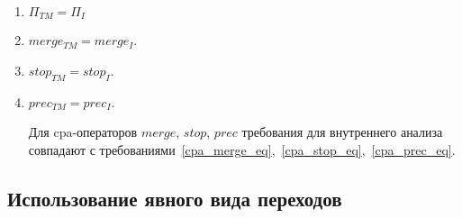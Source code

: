 \begin{enumerate}
\begin{proof}
Действительно, рассмотрим случайный переход $\tau \tcarrow \tau'$, $\tau \in \conc{R}$.
Нужно показать, что $\exists k: \tau' \in Reach^k(R)$.
Так как $\tau \in \conc{R}$ по определению $\conc{R}$~\ref{cpa_conc_tm_def} это означает, что $\exists t, t_1, \dots, t_n \in T, t_i \neq t_j, e_0, e_1, \dots, e_n \in R:$\\
$\tau \in \epp_I
\left(
\begin{pmatrix}
e_0 \\
t_0 
\end{pmatrix},
\left\{
\begin{pmatrix}
e_1 \\
t_1 
\end{pmatrix} ,
\dots ,
\begin{pmatrix}
e_n \\
t_n 
\end{pmatrix}
\right\}
\right)$.

По условию на внутренние cpa-операторы~\ref{cpa_transfer_inner_req} это означает, что найдутся такие элементы $e'_0, e'_1, \dots, e'_n \in E$, которые могут быть получены за два шага: 
\begin{enumerate}
\item применение cpa-оператора $transfer$ и cpa-оператора $apply$ для перехода в текущем потоке;
\item применение cpa-оператора $transfer$ к переходам в окружении, которые были получены на предудыщем шаге с помощью cpa-оператора $apply$.
\end{enumerate}
\end{proof}
И для этих элементов $e'_0, e'_1, \dots, e'_n$ будет выполнено $\tau' \in \epp_I((e_i', t_i), \{(e_0', t_0), \dots, (e_n', t_n)\})$.
То есть, показано, что $\exists k=2: \tau' \in Reach^k(R)$.

\item $\Pi_{TM} = \Pi_{I}$
\item $merge_{TM} = merge_{I}$.
\item $stop_{TM} = stop_{I}$.
\item $prec_{TM} = prec_{I}$.

Для cpa-операторов $merge$, $stop$, $prec$ требования для внутреннего анализа совпадают с требованиями~\ref{cpa_merge_eq},~\ref{cpa_stop_eq},~\ref{cpa_prec_eq}.
\end{enumerate}

\subsection{Использование явного вида переходов}
\label{subsect_transitions}

